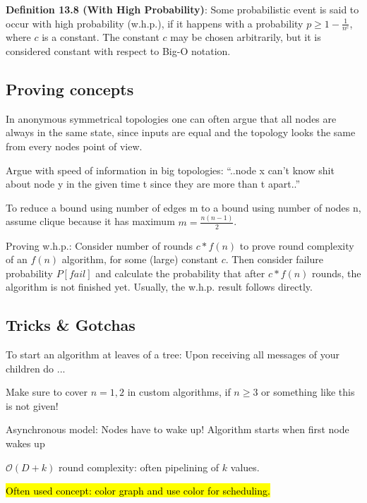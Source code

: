 \documentclass[a4paper, 8pt, landscape]{scrartcl}
\begin{document}
\begin{multicols*}{3}
\textbf{Definition 13.8 (With High Probability)}: Some probabilistic event is said to occur with high probability (w.h.p.), if it happens with a probability $p \geq 1 - \frac{1}{n^c}$, where $c$ is a constant. The constant $c$ may be chosen arbitrarily, but it is considered constant with respect to Big-O notation.


\subsection{Proving concepts}

\begin{compactitem}
\item In anonymous symmetrical topologies one can often argue that all nodes are always in the same state, since inputs are equal and the topology looks the same from every nodes point of view.

\item Argue with speed of information in big topologies: “..node x can’t know shit about node y in the given time t since they are more than t apart..”
\item To reduce a bound using number of edges m to a bound using
number of nodes n, assume clique because it has maximum $m = \frac{n(n-1)}{2}$.

\item Proving w.h.p.: Consider number of rounds $c*f(n)$ to prove round complexity of an $f(n)$ algorithm, for some (large) constant $c$. Then consider failure probability $P[fail]$ and calculate the probability that after $c*f(n)$ rounds, the algorithm is not finished yet. Usually, the w.h.p. result follows directly.
\end{compactitem}

\subsection{Tricks \& Gotchas}

\begin{compactitem}
\item To start an algorithm at leaves of a tree: Upon receiving all messages of your children do ...
\item Make sure to cover $n = 1, 2$ in custom algorithms, if $n \geq 3$ or
something like this is not given!
\item Asynchronous model: Nodes have to wake up! Algorithm starts when first node wakes up
\item $\mathcal{O}(D + k)$ round complexity: often pipelining of $k$ values.
\item \hl{Often used concept: color graph and use color for scheduling.}
\end{compactitem}


\end{multicols*}
\end{document}
